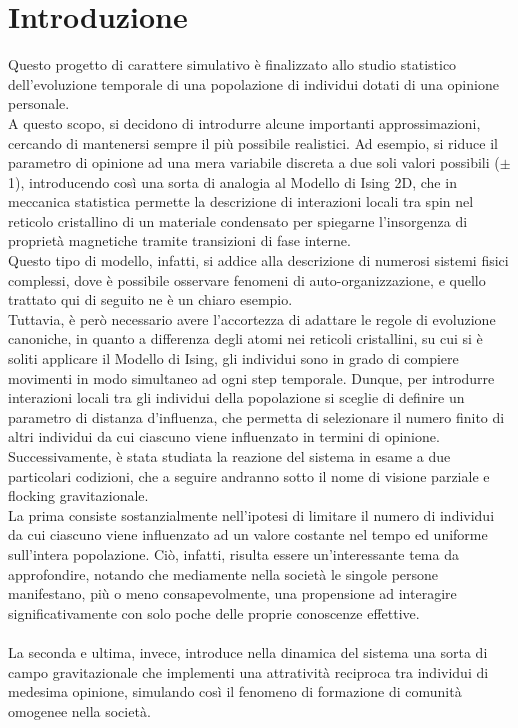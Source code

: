 \documentclass{article}
\begin{document}
\section{Introduzione}
\label{Sec:2}
Questo progetto di carattere simulativo è finalizzato allo studio statistico dell'evoluzione temporale di una popolazione di individui dotati di una opinione personale. 
\\ A questo scopo, si decidono di introdurre alcune importanti approssimazioni, cercando di mantenersi sempre il più possibile realistici. Ad esempio, si riduce il parametro di opinione ad una mera variabile discreta a due soli valori possibili ($\pm$1), introducendo così una sorta di analogia al Modello di Ising 2D, che in meccanica statistica permette la descrizione di interazioni locali tra spin nel reticolo cristallino di un materiale condensato per spiegarne l'insorgenza di proprietà magnetiche tramite transizioni di fase interne.
\\ Questo tipo di modello, infatti, si addice alla descrizione di numerosi sistemi fisici complessi, dove è possibile osservare fenomeni di auto-organizzazione, e quello trattato qui di seguito ne è un chiaro esempio. 
\\ Tuttavia, è però necessario avere l'accortezza di adattare le regole di evoluzione canoniche, in quanto a differenza degli atomi nei reticoli cristallini, su cui si è soliti applicare il Modello di Ising, gli individui sono in grado di compiere movimenti in modo simultaneo ad ogni step temporale. Dunque, per introdurre interazioni locali tra gli individui della popolazione si sceglie di definire un parametro di distanza d'influenza, che permetta di selezionare il numero finito di altri individui da cui ciascuno viene influenzato in termini di opinione.
\\ Successivamente, è stata studiata la reazione del sistema in esame a due particolari codizioni, che a seguire andranno sotto il nome di visione parziale e flocking gravitazionale.
\\ La prima consiste sostanzialmente nell'ipotesi di limitare il numero di individui da cui ciascuno viene influenzato ad un valore costante nel tempo ed uniforme sull'intera popolazione. Ciò, infatti, risulta essere un'interessante tema da approfondire, notando che mediamente nella società le singole persone manifestano, più o meno consapevolmente, una propensione ad interagire significativamente con solo poche delle proprie conoscenze effettive.
\[\]
\\ La seconda e ultima, invece, introduce nella dinamica del sistema una sorta di campo gravitazionale che implementi una attratività reciproca tra individui di medesima opinione, simulando così il fenomeno di formazione di comunità omogenee nella società.
\end{document}
